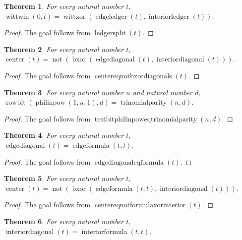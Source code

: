 \documentclass[11pt]{article}
\newtheorem{theorem}{Theorem}[section]
\theoremstyle{definition}
\begin{document}
\begin{theorem}
\label{ll:observations:ledger-split}
For every natural number \(t\), \(\operatorname{wittwin}(0, t) = \operatorname{wittxor}(\operatorname{edgeledger}(t), \operatorname{interiorledger}(t))\).
\end{theorem}
\begin{proof}
The goal follows from \(\operatorname{ledgersplit}(t)\).
\end{proof}
\begin{theorem}
\label{ll:observations:center-eq-not-bxor-diagonals}
For every natural number \(t\), \(\operatorname{center}(t) = \operatorname{not}(\operatorname{bxor}(\operatorname{edgediagonal}(t), \operatorname{interiordiagonal}(t)))\).
\end{theorem}
\begin{proof}
The goal follows from \(\operatorname{centereqnotbxordiagonals}(t)\).
\end{proof}
\begin{theorem}
\label{ll:observations:test-bit-phi-lin-pow-eq-trinomial-parity}
For every natural number \(n\) and natural number \(d\), \(\operatorname{rowbit}(\operatorname{philinpow}(1, n, 1), d) = \operatorname{trinomialparity}(n, d)\).
\end{theorem}
\begin{proof}
The goal follows from \(\operatorname{testbitphilinpoweqtrinomialparity}(n, d)\).
\end{proof}
\begin{theorem}
\label{ll:observations:edge-diagonal-eq-formula}
For every natural number \(t\), \(\operatorname{edgediagonal}(t) = \operatorname{edgeformula}(t, t)\).
\end{theorem}
\begin{proof}
The goal follows from \(\operatorname{edgediagonaleqformula}(t)\).
\end{proof}
\begin{theorem}
\label{ll:observations:center-eq-not-formula-xor-interior}
For every natural number \(t\), \(\operatorname{center}(t) = \operatorname{not}(\operatorname{bxor}(\operatorname{edgeformula}(t, t), \operatorname{interiordiagonal}(t)))\).
\end{theorem}
\begin{proof}
The goal follows from \(\operatorname{centereqnotformulaxorinterior}(t)\).
\end{proof}
\begin{theorem}
\label{ll:observations:interior-diagonal-eq-formula}
For every natural number \(t\), \(\operatorname{interiordiagonal}(t) = \operatorname{interiorformula}(t, t)\).
\end{theorem}
\end{document}
